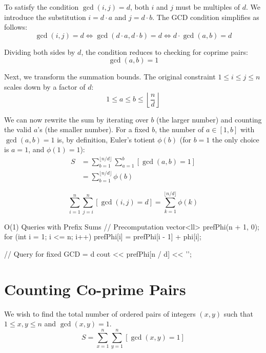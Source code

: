 \documentclass[11pt]{article}
\begin{document}
\begin{derivation}
    To satisfy the condition $\gcd(i, j) = d$, both $i$ and $j$ must be multiples of $d$. We introduce the substitution $i = d \cdot a$ and $j = d \cdot b$. The GCD condition simplifies as follows:
    \[ \gcd(i, j) = d \iff \gcd(d \cdot a, d \cdot b) = d \iff d \cdot \gcd(a, b) = d \]

    Dividing both sides by $d$, the condition reduces to checking for coprime pairs:
    \[ \gcd(a, b) = 1 \]

    Next, we transform the summation bounds. The original constraint $1 \le i \le j \le n$ scales down by a factor of $d$:
    \[ 1 \le a \le b \le \left\lfloor \frac{n}{d} \right\rfloor \]

    We can now rewrite the sum by iterating over $b$ (the larger number) and counting the valid $a$'s (the smaller number). For a fixed $b$, the number of $a \in [1, b]$ with $\gcd(a,b)=1$ is, by definition, Euler's totient $\phi(b)$ (for $b=1$ the only choice is $a=1$, and $\phi(1)=1$):
    \begin{align*}
        S & = \sum_{b=1}^{\lfloor n/d \rfloor} \sum_{a=1}^{b} [\gcd(a, b) = 1] \\
          & = \sum_{b=1}^{\lfloor n/d \rfloor} \phi(b)
    \end{align*}
\end{derivation}

\begin{resultbox}
    \begin{equation}
        \sum_{i=1}^n \sum_{j=i}^n [\gcd(i, j) = d] = \sum_{k=1}^{\lfloor n/d \rfloor} \phi(k)
        \label{eq:fixed_gcd_result}
    \end{equation}
\end{resultbox}

\begin{vscode}{O(1) Queries with Prefix Sums}
// Precomputation
vector<ll> prefPhi(n + 1, 0);
for (int i = 1; i <= n; i++)
    prefPhi[i] = prefPhi[i - 1] + phi[i];

// Query for fixed GCD = d
cout << prefPhi[n / d] << '\n';
\end{vscode}

\pagebreak
\section{Counting Co-prime Pairs}
\label{sec:coprime_pairs}

We wish to find the total number of ordered pairs of integers $(x, y)$ such that $1 \le x, y \le n$ and $\gcd(x, y) = 1$.
\[ S = \sum_{x=1}^n \sum_{y=1}^n [\gcd(x, y) = 1] \]
\end{document}
